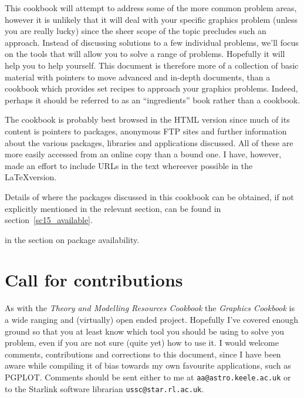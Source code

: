 \documentclass[twoside,11pt]{article}
\newcommand{\htmladdnormallink}[2]{#1}
\newcommand{\htmlref}[2]{#1}
\newcommand{\latex}[1]{#1}
\newcommand{\xref}[3]{#1}
\newcommand{\xlabel}[1]{}
\begin{document}
This cookbook will attempt to address some of the more common problem areas, however it is unlikely that it will deal with your specific graphics problem (unless you are really lucky) since the sheer scope of the topic precludes such an approach. Instead of discussing solutions to a few individual problems, we'll focus on the tools that will allow you to solve a range of problems. Hopefully it will help you to help yourself. This document is therefore more of a collection of basic material with pointers to move advanced and in-depth documents, than a cookbook which provides set recipes to approach your graphics problems. Indeed, perhaps it should be referred to as an ``ingredients'' book rather than a cookbook. 

The cookbook is probably best browsed in the HTML version since much of its content is pointers to packages, anonymous FTP sites and further information about the various packages, libraries and applications discussed. All of these are more easily accessed from an online copy than a bound one. I have, however, made an effort to include URLs in the text whereever possible in the \LaTeX version.

Details of where the packages discussed in this cookbook can be obtained, if not explicitly mentioned in the relevant section, can be found \latex{ in section~\ref{sc15_available}.}
\begin{htmlonly}
in the section on \htmlref{package availability}{sc15_available}.
\end{htmlonly}

\section{\xlabel{sc15_call}Call for contributions\label{sc15_call}}

As with the \xref{{\em Theory and Modelling Resources Cookbook}}{sc13}{} the {\em Graphics Cookbook} is a wide ranging and (virtually) open ended project. Hopefully I've covered enough ground so that you at least know which tool you should be using to solve you problem, even if you are not sure (quite yet) how to use it. I would welcome comments, contributions and corrections to this document, since I have been aware while compiling it of bias towards my own favourite applications, such as PGPLOT. Comments should be sent either to me at \htmladdnormallink{{\tt aa@astro.keele.ac.uk}}{mailto:aa@astro.keele.ac.uk} or to the Starlink software librarian \htmladdnormallink{{\tt ussc@star.rl.ac.uk}}{mailto:ussc@star.rl.ac.uk}. 
\end{document}
